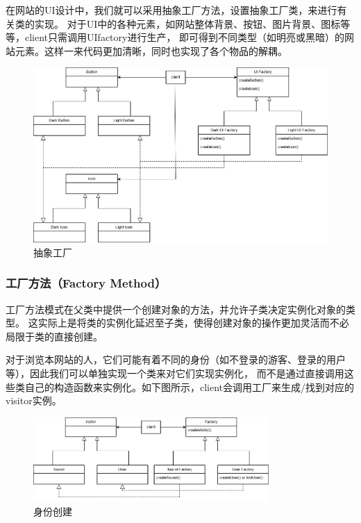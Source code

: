 \documentclass[12pt]{ctexart} %
\begin{document}
在网站的UI设计中，我们就可以采用抽象工厂方法，设置抽象工厂类，来进行有关类的实现。
对于UI中的各种元素，如网站整体背景、按钮、图片背景、图标等等，client只需调用UIfactory进行生产，
即可得到不同类型（如明亮或黑暗）的网站元素。这样一来代码更加清晰，同时也实现了各个物品的解耦。
\begin{figure}[H]
  \centering
  \includegraphics[width=\textwidth]{abs_factory.png}
  \caption{抽象工厂}
\end{figure}

\subsubsection{工厂方法（Factory Method）} 
工厂方法模式在父类中提供一个创建对象的方法，并允许子类决定实例化对象的类型。
这实际上是将类的实例化延迟至子类，使得创建对象的操作更加灵活而不必局限于类的直接创建。

对于浏览本网站的人，它们可能有着不同的身份（如不登录的游客、登录的用户等），因此我们可以单独实现一个类来对它们实现实例化，
而不是通过直接调用这些类自己的构造函数来实例化。如下图所示，client会调用工厂来生成/找到对应的visitor实例。
\begin{figure}[H]
  \centering
  \includegraphics[width=0.8\textwidth]{factory_1.png}
  \caption{身份创建}
\end{figure}
\end{document}
